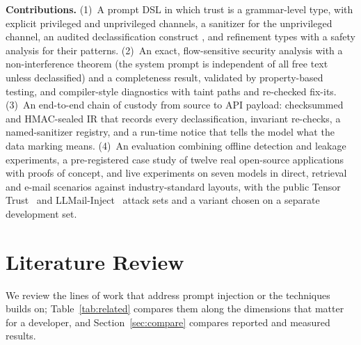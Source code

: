 \documentclass[conference]{IEEEtran}
\begin{document}
\textbf{Contributions.}
(1)~A prompt DSL in which trust is a grammar-level type, with explicit privileged and unprivileged channels, a sanitizer for the unprivileged channel, an audited declassification construct , and refinement types with a safety analysis for their patterns.
(2)~An exact, flow-sensitive security analysis with a non-interference theorem (the system prompt is independent of all free text unless declassified) and a completeness result, validated by property-based testing, and compiler-style diagnostics with taint paths and re-checked fix-its.
(3)~An end-to-end chain of custody from source to API payload: checksummed and HMAC-sealed IR that records every declassification, invariant re-checks, a named-sanitizer registry, and a run-time notice that tells the model what the data marking means.
(4)~An evaluation combining offline detection and leakage experiments, a pre-registered case study of twelve real open-source applications with proofs of concept, and live experiments on seven models in direct, retrieval and e-mail scenarios against industry-standard layouts, with the public Tensor Trust~\cite{toyer2024tensortrust} and LLMail-Inject~\cite{abdelnabi2025llmail} attack sets and a variant chosen on a separate development set.

\section{Literature Review}\label{sec:lit}

We review the lines of work that address prompt injection or the techniques \TL{} builds on; Table~\ref{tab:related} compares them along the dimensions that matter for a developer, and Section~\ref{sec:compare} compares reported and measured results.
\end{document}
